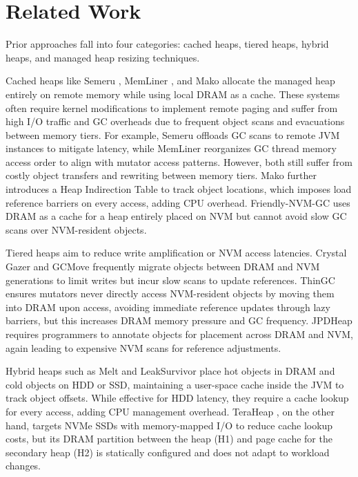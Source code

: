 \section{Related Work}
Prior approaches fall into four categories: cached heaps, tiered heaps, hybrid heaps, and managed heap resizing techniques.

Cached heaps like Semeru \cite{semeru}, MemLiner \cite{memliner}, and Mako \cite{mako} allocate the managed heap entirely on remote memory while using local DRAM as a cache. These systems often require kernel modifications to implement remote paging and suffer from high I/O traffic and GC overheads due to frequent object scans and evacuations between memory tiers. For example, Semeru offloads GC scans to remote JVM instances to mitigate latency, while MemLiner reorganizes GC thread memory access order to align with mutator access patterns. However, both still suffer from costly object transfers and rewriting between memory tiers. Mako further introduces a Heap Indirection Table to track object locations, which imposes load reference barriers on every access, adding CPU overhead. Friendly-NVM-GC \cite{friendlynvmgc} uses DRAM as a cache for a heap entirely placed on NVM but cannot avoid slow GC scans over NVM-resident objects.

Tiered heaps aim to reduce write amplification or NVM access latencies. Crystal Gazer \cite{crystalgazer1, crystalgazer2} and GCMove \cite{gcmove} frequently migrate objects between DRAM and NVM generations to limit writes but incur slow scans to update references. ThinGC \cite{thingc} ensures mutators never directly access NVM-resident objects by moving them into DRAM upon access, avoiding immediate reference updates through lazy barriers, but this increases DRAM memory pressure and GC frequency. JPDHeap \cite{jpdheap} requires programmers to annotate objects for placement across DRAM and NVM, again leading to expensive NVM scans for reference adjustments.

Hybrid heaps such as Melt \cite{melt} and LeakSurvivor \cite{leaksurvivor} place hot objects in DRAM and cold objects on HDD or SSD, maintaining a user-space cache inside the JVM to track object offsets. While effective for HDD latency, they require a cache lookup for every access, adding CPU management overhead. TeraHeap \cite{TeraHeap}, on the other hand, targets NVMe SSDs with memory-mapped I/O to reduce cache lookup costs, but its DRAM partition between the heap (H1) and page cache for the secondary heap (H2) is statically configured and does not adapt to workload changes.

